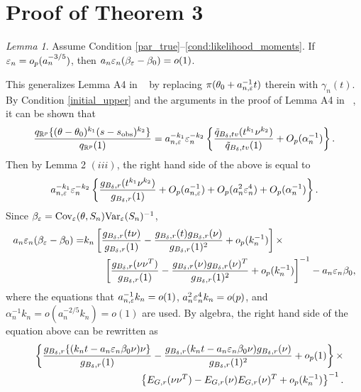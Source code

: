 \documentclass[9pt]{article}
\theoremstyle{remark}
\newtheorem{lemma}{Lemma}
\begin{document}

\section{Proof of Theorem 3}

\begin{lemma}\label{Alemma5} 
Assume Condition \ref{par_true}--\ref{cond:likelihood_moments}. If $\varepsilon_{n}=o_{p}(a_{n}^{-3/5})$, then $a_{n}\varepsilon_{n}(\beta_{\varepsilon}-\beta_{0})=o(1)$.
\end{lemma}
	This generalizes Lemma A4 in ~\cite{Li2017} by replacing $\pi(\theta_{0}+a_{n,\varepsilon}^{-1}t)$
	therein with $\gamma_{n}(t)$. By Condition \ref{initial_upper} and the arguments in the proof
	of Lemma A4 in ~\cite{Li2017}, it can be shown that 
	\[
	\frac{q_{\mathbb{R}^{p}}\{(\theta-\theta_{0})^{k_{1}}(s-s_{\rm obs})^{k_{2}}\}}{q_{\mathbb{R}^{p}}(1)}=a_{n,\varepsilon}^{-k_{1}}\varepsilon_{n}^{-k_{2}}\left\{ \frac{\tilde{q}_{B_{\delta},tv}(t^{k_{1}}\nu^{k_{2}})}{\tilde{q}_{B_{\delta},tv}(1)}+O_{p}(\alpha_{n}^{-1})\right\} .
	\]
	Then by Lemma 2 $(iii)$, the right hand side of the above is equal
	to 
	\[
	a_{n,\varepsilon}^{-k_{1}}\varepsilon_{n}^{-k_{2}}\left\{ \frac{g_{B_{\delta},r}(t^{k_{1}}\nu^{k_{2}})}{g_{B_{\delta},r}(1)}+O_{p}(a_{n,\varepsilon}^{-1})+O_{p}(a_{n}^{2}\varepsilon_{n}^{4})+O_{p}(\alpha_{n}^{-1})\right\} .
	\]
	Since $\beta_{\varepsilon}=\text{Cov}_{\varepsilon}(\theta,S_{n})\text{Var}_{\varepsilon}(S_{n})^{-1}$,
	\begin{align*}
	a_{n}\varepsilon_{n}(\beta_{\varepsilon}-\beta_{0})= & k_{n}\left[\frac{g_{B_{\delta},r}(t\nu)}{g_{B_{\delta},r}(1)}-\frac{g_{B_{\delta},r}(t)g_{B_{\delta},r}(\nu)}{g_{B_{\delta},r}(1)^{2}}+o_{p}(k_{n}^{-1})\right]\times\\
	& \qquad\left[\frac{g_{B_{\delta},r}(\nu\nu^{T})}{g_{B_{\delta},r}(1)}-\frac{g_{B_{\delta},r}(\nu)g_{B_{\delta},r}(\nu)^{T}}{g_{B_{\delta},r}(1)^{2}}+o_{p}(k_{n}^{-1})\right]^{-1}-a_{n}\varepsilon_{n}\beta_{0},
	\end{align*}
	where the equations that $a_{n,\varepsilon}^{-1}k_{n}=o(1)$, $a_{n}^{2}\varepsilon_{n}^{4}k_{n}=o(p)$,
	and $\alpha_{n}^{-1}k_{n}=o(a_{n}^{-2/5}k_{n})=o(1)$ are used. By
	algebra, the right hand side of the equation above can be rewritten
	as 
	\begin{eqnarray*}
		&  & \left\{ \frac{g_{B_{\delta},r}\{(k_{n}t-a_{n}\varepsilon_{n}\beta_{0}\nu)\nu\}}{g_{B_{\delta},r}(1)}-\frac{g_{B_{\delta},r}(k_{n}t-a_{n}\varepsilon_{n}\beta_{0}\nu)g_{B_{\delta},r}(\nu)}{g_{B_{\delta},r}(1)^{2}}+o_{p}(1)\right\} \times\\
		&  & \qquad\left\{ E_{G,r}(\nu\nu^{T})-E_{G,r}(\nu)E_{G,r}(\nu)^{T}+o_{p}(k_{n}^{-1})\right\} ^{-1}.
	\end{eqnarray*}
\end{document}
